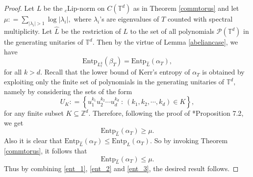\documentclass[a4paper,11pt,reqno]{amsart}
\theoremstyle{plain}
\newtheorem{lem}[thm]{Lemma}
\theoremstyle{mainthmstyle}
\theoremstyle{named}
\numberwithin{equation}{section}
\begin{document}
\begin{proof}
Let $L$ be the ${}_c\mathrm{Lip}$-norm on $C (\mathbb T^{d})$ as in Theorem \ref{commtorus} and let $\mu : = \sum\limits_{\left \lvert \lambda_i \right \rvert > 1} \log \left \lvert \lambda_i \right \rvert,$ where $\lambda_i$'s are eigenvalues of $T$ counted with spectral multiplicity. Let $\widehat {L}$ be the restriction of $L$ to the set of all polynomials $\mathcal {P} (\mathbb T^{d})$ in the generating unitaries of $\mathbb T^{d}$. Then by the virtue of Lemma \ref{abeliancase}, we have \begin{equation} \label{ent_1} \mathrm {Entp}_{L_{\ell}^{k}} \left (\beta_{T} \right ) = \mathrm {Entp}_{\widehat{L}} \left (\alpha_{T} \right ), \end{equation} for all $k > d.$ Recall that the lower bound of Kerr's entropy of $\alpha_{T}$ is obtained by exploiting only the finite set of polynomials in the generating unitaries of $\mathbb T^{d},$ namely by considering the sets of the form $$U_K : = \left \{u_1^{k_1} u_2^{k_2} \cdots u_d^{k_d}\ :\ \left (k_1, k_2, \cdots, k_d \right ) \in K \right \},$$ for any finite subset $K \subseteq \mathbb Z^{d}$. Therefore, following the proof of \cite{Kerr}*{Proposition 7.2}, we get \begin{equation} \label{ent_2} \mathrm {Entp}_{\widehat{L}} \left (\alpha_{T} \right ) \geq \mu. \end{equation} Also it is clear that $\mathrm {Entp}_{\widehat{L}} \left (\alpha_{T} \right ) \leq \mathrm {Entp}_{L} \left (\alpha_{T} \right ).$ So by invoking Theorem \ref{commtorus}, it follows that \begin{equation} \label{ent_3} \mathrm {Entp}_{\widehat{L}} \left (\alpha_{T} \right ) \leq \mu. \end{equation} Thus by combining \eqref{ent_1}, \eqref{ent_2} and \eqref{ent_3}, the desired result follows. 
\end{proof}
\end{document}
